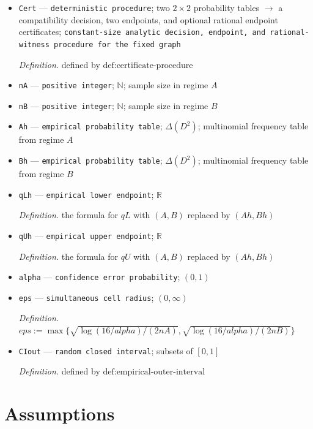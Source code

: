 \documentclass{article}
\begin{document}
\begin{itemize}
  \par\smallskip\noindent\emph{Definition.} defined by \(\text{def:threshold-extension-handle}\)
  \item \texttt{Cert} --- \texttt{deterministic procedure}; two \(2\times2\) probability tables \(\to\) a compatibility decision, two endpoints, and optional rational endpoint certificates; \texttt{constant-\allowbreak{}size analytic decision,\allowbreak{} endpoint,\allowbreak{} and rational-\allowbreak{}witness procedure for the fixed graph}
  \par\smallskip\noindent\emph{Definition.} defined by \(\text{def:certificate-procedure}\)
  \item \texttt{nA} --- \texttt{positive integer}; \(\mathbb N\); sample size in regime \(A\)
  \item \texttt{nB} --- \texttt{positive integer}; \(\mathbb N\); sample size in regime \(B\)
  \item \texttt{Ah} --- \texttt{empirical probability table}; \(\Delta(D^2)\); multinomial frequency table from regime \(A\)
  \item \texttt{Bh} --- \texttt{empirical probability table}; \(\Delta(D^2)\); multinomial frequency table from regime \(B\)
  \item \texttt{qLh} --- \texttt{empirical lower endpoint}; \(\mathbb R\)
  \par\smallskip\noindent\emph{Definition.} the formula for \(qL\) with \((A,B)\) replaced by \((Ah,Bh)\)
  \item \texttt{qUh} --- \texttt{empirical upper endpoint}; \(\mathbb R\)
  \par\smallskip\noindent\emph{Definition.} the formula for \(qU\) with \((A,B)\) replaced by \((Ah,Bh)\)
  \item \texttt{alpha} --- \texttt{confidence error probability}; \((0,1)\)
  \item \texttt{eps} --- \texttt{simultaneous cell radius}; \((0,\infty)\)
  \par\smallskip\noindent\emph{Definition.} \(eps:=\max\{\sqrt{\log(16/alpha)/(2nA)},\sqrt{\log(16/alpha)/(2nB)}\}\)
  \item \texttt{CIout} --- \texttt{random closed interval}; subsets of \([0,1]\)
  \par\smallskip\noindent\emph{Definition.} defined by \(\text{def:empirical-outer-interval}\)
\end{itemize}

\section{Assumptions}
\end{document}
